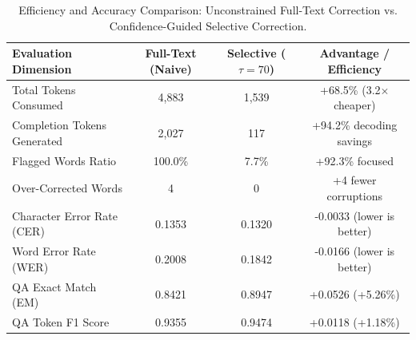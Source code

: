 \begin{table}[htbp]
\centering
\caption{Efficiency and Accuracy Comparison: Unconstrained Full-Text Correction vs. Confidence-Guided Selective Correction.}
\label{tab:efficiency}
\begin{tabular}{lccc}
\toprule
\textbf{Evaluation Dimension} & \textbf{Full-Text (Naive)} & \textbf{Selective ($\tau=70$)} & \textbf{Advantage / Efficiency} \\
\midrule
Total Tokens Consumed & 4,883 & 1,539 & +68.5\% (3.2$\times$ cheaper) \\
Completion Tokens Generated & 2,027 & 117 & +94.2\% decoding savings \\
Flagged Words Ratio & 100.0\% & 7.7\% & +92.3\% focused \\
Over-Corrected Words & 4 & 0 & +4 fewer corruptions \\
Character Error Rate (CER) & 0.1353 & 0.1320 & -0.0033 (lower is better) \\
Word Error Rate (WER) & 0.2008 & 0.1842 & -0.0166 (lower is better) \\
QA Exact Match (EM) & 0.8421 & 0.8947 & +0.0526 (+5.26\%) \\
QA Token F1 Score & 0.9355 & 0.9474 & +0.0118 (+1.18\%) \\
\bottomrule
\end{tabular}
\end{table}